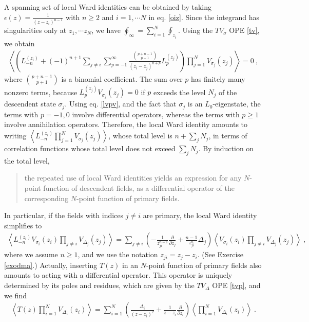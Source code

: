 \documentclass[12pt, a4paper, notitlepage, twoside]{report}
\numberwithin{equation}{section}
\theoremstyle{break}
\begin{document}
A spanning set of local Ward identities can be obtained by taking $\epsilon(z) = \frac{1}{(z-z_i)^{n-1}}$ with $n\geq 2$ and $i=1, \cdots N$ in eq. \eqref{oiz}. 
Since the integrand has singularities only at $z_1,\cdots z_N$, we have $\oint_\infty=\sum_{i=1}^N \oint_{z_i}$.
Using the 
$TV_\sigma$ OPE \eqref{tv}, we obtain
\begin{align}
 \left\langle \left( L_{-n}^{(z_i)} + (-1)^{n+1}\sum_{j\neq i}\sum_{p=-1}^\infty \frac{\binom{p+n-1}{p+1}}{(z_i-z_j)^{n+p}} L_p^{(z_j)}\right)  \prod_{j=1}^N V_{\sigma_j}(z_j) \right\rangle = 0\ ,
\label{lwi}
\end{align}
where $\binom{p+n-1}{p+1}$ is a binomial coefficient.
The sum over $p$ has finitely many nonzero terms, because $L_p^{(z_j)}V_{\sigma_j}(z_j)=0$ if $p$ exceeds the level $N_j$ of the descendent state $\sigma_j$. 
Using eq. \eqref{lvpv}, and the fact that $\sigma_j$ is an $L_0$-eigenstate, the terms with $p=-1,0$ involve differential operators, whereas the terms with $p\geq 1$ involve annihilation operators. 
Therefore, the local Ward identity amounts to writing $\left\langle  L_{-n}^{(z_i)} \prod_{j=1}^N V_{\sigma_j}(z_j) \right\rangle$, whose total level is $n+\sum_j N_j$, in terms of correlation functions whose total level does not exceed $\sum_jN_j$. By induction on the total level,
\begin{quote}
 the repeated use of local Ward identities yields an expression for any $N$-point function of descendent fields, as a differential operator of the corresponding $N$-point function of primary fields.
\end{quote}
In particular, if the fields with indices $j\neq i$ are primary, the local Ward identity simplifies to
\begin{align}
 \boxed{\left\langle L_{-n}^{(z_i)}V_{\sigma_i}(z_i)\prod_{j\neq i} V_{\Delta_j}(z_j) \right\rangle =
\sum_{j\neq i} \left(-\frac{1}{z_{ji}^{n-1}} {\frac{\partial}{\partial z_j}}  + \frac{n-1}{z_{ji}^n} \Delta_j\right)
\left\langle V_{\sigma_i}(z_i)\prod_{j\neq i} V_{\Delta_j}(z_j) \right\rangle} \ ,
\label{lmn}
\end{align}
where we assume $n\geq 1$, and we use the notation $z_{ji}=z_j-z_i$. (See Exercise \ref{exodma}.) Actually, inserting $T(z)$ in an $N$-point function of primary fields also amounts to acting with a differential operator. This operator is uniquely determined by its poles and residues, which are given by the $TV_\Delta$ OPE \eqref{tvp}, and we find
\begin{align}
 \boxed{\left\langle T(z) \prod_{i=1}^N V_{\Delta_i}(z_i)\right\rangle = \sum_{i=1}^N \left(\frac{\Delta_i}{(z-z_i)^2} + \frac{1}{z-z_i}{\frac{\partial}{\partial z_i}}\right)\left\langle  \prod_{i=1}^N V_{\Delta_i}(z_i)\right\rangle }\ .
\label{dtz}
\end{align}
\end{document}

